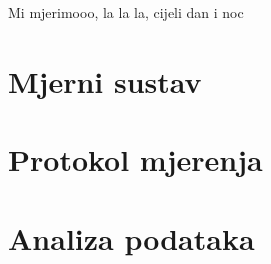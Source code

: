 \documentclass[../diplomski_rad.tex]{subfiles}
\begin{document}
\sloppy

\justifying

Mi mjerimooo, la la la, cijeli dan i noc

\section{Mjerni sustav}

\section{Protokol mjerenja}

\section{Analiza podataka}
\end{document}
